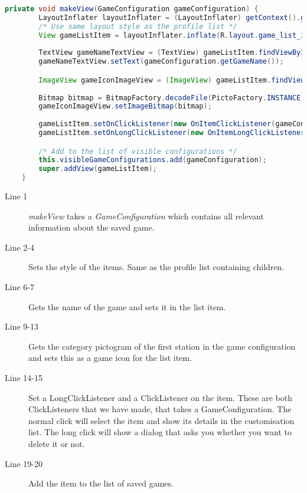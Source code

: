 \begin{lstlisting}[language=java,firstnumber=1,caption={The method to create a list item},label=lst:makeview]
private void makeView(GameConfiguration gameConfiguration) {
        LayoutInflater layoutInflater = (LayoutInflater) getContext().getSystemService(Context.LAYOUT_INFLATER_SERVICE);
        /* Use same layout style as the profile list */
        View gameListItem = layoutInflater.inflate(R.layout.game_list_item, null);
        
        TextView gameNameTextView = (TextView) gameListItem.findViewById(R.id.gameName);
        gameNameTextView.setText(gameConfiguration.getGameName());

        ImageView gameIconImageView = (ImageView) gameListItem.findViewById(R.id.gameIcon);
        
        Bitmap bitmap = BitmapFactory.decodeFile(PictoFactory.INSTANCE.getPictogram(super.getContext(),gameConfiguration.getStation(0).getCategory()).getImagePath());
        gameIconImageView.setImageBitmap(bitmap);
        
        gameListItem.setOnClickListener(new OnItemClickListener(gameConfiguration));
        gameListItem.setOnLongClickListener(new OnItemLongClickListener(gameConfiguration));

        /* Add to the list of visible configurations */
        this.visibleGameConfigurations.add(gameConfiguration);
        super.addView(gameListItem);
    }
\end{lstlisting}
\begin{description}
\item[Line 1] \textit{makeView} takes a \textit{GameConfiguration} which contains all relevant information about the saved game.
\item[Line 2-4] Sets the style of the items. Same as the profile list containing children.
\item[Line 6-7] Gets the name of the game and sets it in the list item.
\item[Line 9-13] Gets the category pictogram of the first station in the game configuration and sets this as a game icon for the list item.
\item[Line 14-15] Set a LongClickListener and a ClickListener on the item. These are both ClickListeners that we have made, that takes a GameConfiguration. The normal click will select the item and show its details in the customisation list. The long click will show a dialog that asks you whether you want to delete it or not. 
\item[Line 19-20] Add the item to the list of saved games.
\end{description}

